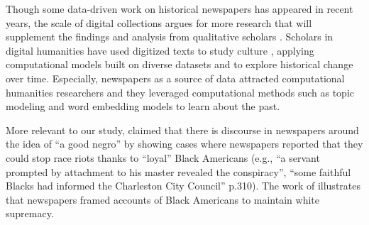 \documentclass[11pt]{article}
\begin{document}
Though some data-driven work on historical newspapers has appeared in recent years, the scale of digital collections argues for more research that will supplement the findings and analysis from qualitative scholars \citep{gabrial2004melancholy,narayan_slavery_2020}. 
Scholars in digital humanities have used digitized texts to study culture \cite{griebel2024locating}, applying computational models built on diverse datasets \cite{park2022raison} and to explore historical change over time. 
Especially, newspapers as a source of data attracted computational humanities researchers and they leveraged computational methods \citep{park2023quantitative} such as topic modeling \cite{hengchen_data-driven_2021,klein_exploratory_2015} and word embedding models \cite{soni2021abolitionist} to learn about the past. 


More relevant to our study, \citet{gabrial2004melancholy} claimed that there is discourse in newspapers around the idea of ``a good negro'' by showing cases where newspapers reported that they could stop race riots thanks to ``loyal'' Black Americans (e.g., ``a servant prompted by attachment to his master revealed the conspiracy'', ``some faithful Blacks had informed the Charleston City Council'' p.310). 
The work of \citet{gabrial2004melancholy} illustrates that newspapers framed accounts of Black Americans to maintain white supremacy.
\end{document}
